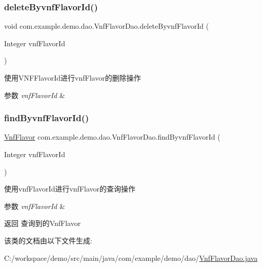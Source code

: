 \subsubsection{\texorpdfstring{delete\+Byvnf\+Flavor\+Id()}{deleteByvnfFlavorId()}}
{\footnotesize\ttfamily void com.\+example.\+demo.\+dao.\+Vnf\+Flavor\+Dao.\+delete\+Byvnf\+Flavor\+Id (\begin{DoxyParamCaption}\item[{Integer}]{vnf\+Flavor\+Id }\end{DoxyParamCaption})}

使用\+V\+N\+F\+Flavor\+Id进行vnf\+Flavor的删除操作 
\begin{DoxyParams}{参数}
{\em vnf\+Flavor\+Id} & \\
\hline
\end{DoxyParams}
\mbox{\label{interfacecom_1_1example_1_1demo_1_1dao_1_1_vnf_flavor_dao_a3a58a6f91a36fdce9dfa509de05e2b81}} 
\subsubsection{\texorpdfstring{find\+Byvnf\+Flavor\+Id()}{findByvnfFlavorId()}}
{\footnotesize\ttfamily \mbox{\hyperlink{classcom_1_1example_1_1demo_1_1modular_1_1_vnf_flavor}{Vnf\+Flavor}} com.\+example.\+demo.\+dao.\+Vnf\+Flavor\+Dao.\+find\+Byvnf\+Flavor\+Id (\begin{DoxyParamCaption}\item[{Integer}]{vnf\+Flavor\+Id }\end{DoxyParamCaption})}

使用vnf\+Flavor\+Id进行vnf\+Flavor的查询操作 
\begin{DoxyParams}{参数}
{\em vnf\+Flavor\+Id} & \\
\hline
\end{DoxyParams}
\begin{DoxyReturn}{返回}
查询到的\+Vnf\+Flavor 
\end{DoxyReturn}


该类的文档由以下文件生成\+:\begin{DoxyCompactItemize}
\item 
C\+:/workspace/demo/src/main/java/com/example/demo/dao/\mbox{\hyperlink{_vnf_flavor_dao_8java}{Vnf\+Flavor\+Dao.\+java}}\end{DoxyCompactItemize}
